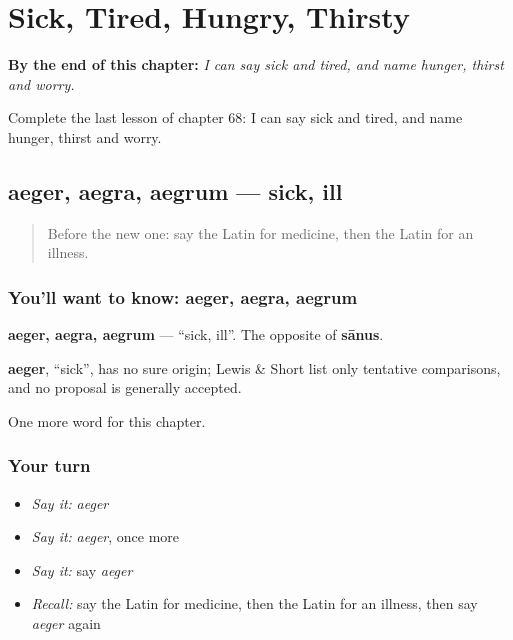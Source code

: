 
\chapter{Sick, Tired, Hungry, Thirsty}
\label{ch:la-sick-tired-hungry-thirsty}

\begin{chapteropening}
\textbf{By the end of this chapter:} \emph{I can say sick and tired, and name hunger, thirst and worry.}

Complete the last lesson of chapter 68: I can say sick and tired, and name hunger, thirst and worry.
\end{chapteropening}

\section[aeger, aegra, aegrum]{aeger, aegra, aegrum — sick, ill}

\label{lesson:LA-C68-aeger}



\begin{quote}
Before the new one: say the Latin for medicine, then the Latin for an illness.
\end{quote}

\subsection*{You'll want to know: aeger, aegra, aegrum}
\textbf{aeger, aegra, aegrum} — \textquotedblleft{}sick, ill\textquotedblright{}. The opposite of \textbf{sānus}.

\begin{cousinweb}
\textbf{aeger}, \textquotedblleft{}sick\textquotedblright{}, has no sure origin; Lewis \& Short list only tentative comparisons, and no proposal is generally accepted.
\end{cousinweb}

\begin{grammarlens}[title={What you've built}]
One more word for this chapter.
\end{grammarlens}

\subsection*{Your turn}
\begin{itemize}
\raggedright
  \item \emph{Say it:} \emph{aeger}
  \item \emph{Say it:} \emph{aeger}, once more
  \item \emph{Say it:} say \emph{aeger}
  \item \emph{Recall:} say the Latin for medicine, then the Latin for an illness, then say \emph{aeger} again
\end{itemize}

